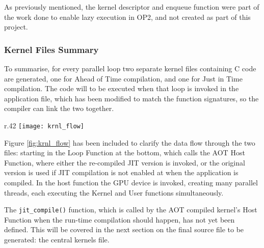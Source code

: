 As previously mentioned, the kernel descriptor and enqueue function were part of the work done to enable lazy execution in OP2, and not created as part of this project.

\clearpage

\subsubsection{Kernel Files Summary}
\label{impl_summary}

To summarise, for every parallel loop two separate kernel files containing C code are generated, one for Ahead of Time compilation, and one for Just in Time compilation. The code will to be executed when that loop is invoked in the application file, which has been modified to match the function signatures, so the compiler can link the two together.

\begin{wrapfigure}{r}{.42\textwidth}
  \centering
  \texttt{[image: krnl\_flow]}
  \caption{Kernel Flow}
  \label{fig:krnl_flow}
\end{wrapfigure}

Figure \ref{fig:krnl_flow} has been included to clarify the data flow through the two files: starting in the Loop Function at the bottom, which calls the AOT Host Function, where either the re-compiled JIT version is invoked, or the original version is used if JIT compilation is not enabled at when the application is compiled. In the host function the GPU device is invoked, creating many parallel threads, each executing the Kernel and User functions simultaneously.

The \verb|jit_compile()| function, which is called by the AOT compiled kernel's Host Function when the run-time compilation should happen, has not yet been defined. This will be covered in the next section on the final source file to be generated: the central kernels file.
\clearpage
